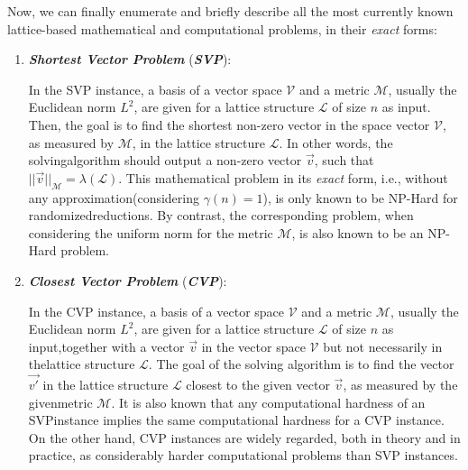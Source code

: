 \documentclass[runningheads]{llncs}
\numberwithin{equation}{section}
\begin{document}
    \noindent Now, we can finally enumerate and briefly describe all the most currently known lattice-based mathematical and computational problems, in their \textit{exact} forms:

    \begin{enumerate}
        \item \textbf{\textit{Shortest Vector Problem}} (\textbf{\textit{SVP}}):
        \vspace{0.6ex}
        
        In the SVP instance, a basis of a vector space $\mathcal{V}$ and a metric $\mathcal{M}$, usually the Euclidean norm ${L}^{2}$, are given for a lattice structure $\mathcal{L}$ of size $n$ as input. Then, the goal is to find the shortest non-zero vector in the space vector $\mathcal{V}$, as measured by $\mathcal{M}$, in the lattice structure $\mathcal{L}$. In other words, the solving\break algorithm should output a non-zero vector $\Vec{v}$, such that ${||\Vec{v}||}_{\mathcal{M}} = \lambda(\mathcal{L})$. This mathematical problem in its \textit{exact} form, i.e., without any approximation\break (considering $\gamma(n) = 1$), is only known to be NP-Hard for randomized\break reductions. By contrast, the corresponding problem, when considering the uniform norm for the metric $\mathcal{M}$, is also known to be an NP-Hard problem.

        \newpage

        \item \textbf{\textit{Closest Vector Problem}} (\textbf{\textit{CVP}}):
        \vspace{0.6ex}

        In the CVP instance, a basis of a vector space $\mathcal{V}$ and a metric $\mathcal{M}$, usually the Euclidean norm ${L}^{2}$, are given for a lattice structure $\mathcal{L}$ of size $n$ as input,\break together with a vector $\Vec{v}$ in the vector space $\mathcal{V}$ but not necessarily in the\break lattice structure $\mathcal{L}$. The goal of the solving algorithm is to find the vector $\Vec{v'}$ in the lattice structure $\mathcal{L}$ closest to the given vector $\Vec{v}$, as measured by the given\break metric $\mathcal{M}$. It is also known that any computational hardness of an SVP\break instance implies the same computational hardness for a CVP instance. On the other hand, CVP instances are widely regarded, both in theory and in \break practice, as considerably harder computational problems than SVP instances.
        \vspace{0.1ex}


\end{enumerate}
\end{document}
